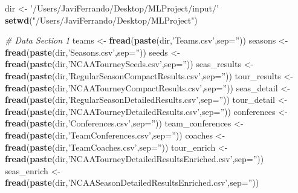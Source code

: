 \documentclass[]{article}
\newenvironment{Shaded}{\begin{snugshade}}{\end{snugshade}}
\newcommand{\KeywordTok}[1]{\textcolor[rgb]{0.13,0.29,0.53}{\textbf{#1}}}
\newcommand{\DataTypeTok}[1]{\textcolor[rgb]{0.13,0.29,0.53}{#1}}
\newcommand{\StringTok}[1]{\textcolor[rgb]{0.31,0.60,0.02}{#1}}
\newcommand{\CommentTok}[1]{\textcolor[rgb]{0.56,0.35,0.01}{\textit{#1}}}
\newcommand{\NormalTok}[1]{#1}
\begin{document}
\begin{Shaded}
\begin{Highlighting}[]
\NormalTok{dir <-}\StringTok{ '/Users/JaviFerrando/Desktop/MLProject/input/'}
\KeywordTok{setwd}\NormalTok{(}\StringTok{"/Users/JaviFerrando/Desktop/MLProject"}\NormalTok{)}

\CommentTok{# Data Section 1}
\NormalTok{teams <-}\StringTok{ }\KeywordTok{fread}\NormalTok{(}\KeywordTok{paste}\NormalTok{(dir,}\StringTok{'Teams.csv'}\NormalTok{,}\DataTypeTok{sep=}\StringTok{''}\NormalTok{))}
\NormalTok{seasons <-}\StringTok{ }\KeywordTok{fread}\NormalTok{(}\KeywordTok{paste}\NormalTok{(dir,}\StringTok{'Seasons.csv'}\NormalTok{,}\DataTypeTok{sep=}\StringTok{''}\NormalTok{))}
\NormalTok{seeds <-}\StringTok{ }\KeywordTok{fread}\NormalTok{(}\KeywordTok{paste}\NormalTok{(dir,}\StringTok{'NCAATourneySeeds.csv'}\NormalTok{,}\DataTypeTok{sep=}\StringTok{''}\NormalTok{))}
\NormalTok{seas_results <-}\StringTok{ }\KeywordTok{fread}\NormalTok{(}\KeywordTok{paste}\NormalTok{(dir,}\StringTok{'RegularSeasonCompactResults.csv'}\NormalTok{,}\DataTypeTok{sep=}\StringTok{''}\NormalTok{))}
\NormalTok{tour_results <-}\StringTok{ }\KeywordTok{fread}\NormalTok{(}\KeywordTok{paste}\NormalTok{(dir,}\StringTok{'NCAATourneyCompactResults.csv'}\NormalTok{,}\DataTypeTok{sep=}\StringTok{''}\NormalTok{))}
\NormalTok{seas_detail <-}\StringTok{ }\KeywordTok{fread}\NormalTok{(}\KeywordTok{paste}\NormalTok{(dir,}\StringTok{'RegularSeasonDetailedResults.csv'}\NormalTok{,}\DataTypeTok{sep=}\StringTok{''}\NormalTok{))}
\NormalTok{tour_detail <-}\StringTok{ }\KeywordTok{fread}\NormalTok{(}\KeywordTok{paste}\NormalTok{(dir,}\StringTok{'NCAATourneyDetailedResults.csv'}\NormalTok{,}\DataTypeTok{sep=}\StringTok{''}\NormalTok{))}
\NormalTok{conferences <-}\StringTok{ }\KeywordTok{fread}\NormalTok{(}\KeywordTok{paste}\NormalTok{(dir,}\StringTok{'Conferences.csv'}\NormalTok{,}\DataTypeTok{sep=}\StringTok{''}\NormalTok{))}
\NormalTok{team_conferences <-}\StringTok{ }\KeywordTok{fread}\NormalTok{(}\KeywordTok{paste}\NormalTok{(dir,}\StringTok{'TeamConferences.csv'}\NormalTok{,}\DataTypeTok{sep=}\StringTok{''}\NormalTok{))}
\NormalTok{coaches <-}\StringTok{ }\KeywordTok{fread}\NormalTok{(}\KeywordTok{paste}\NormalTok{(dir,}\StringTok{'TeamCoaches.csv'}\NormalTok{,}\DataTypeTok{sep=}\StringTok{''}\NormalTok{))}
\NormalTok{tour_enrich <-}\StringTok{ }\KeywordTok{fread}\NormalTok{(}\KeywordTok{paste}\NormalTok{(dir,}\StringTok{'NCAATourneyDetailedResultsEnriched.csv'}\NormalTok{,}\DataTypeTok{sep=}\StringTok{''}\NormalTok{))}
\NormalTok{seas_enrich <-}\StringTok{ }\KeywordTok{fread}\NormalTok{(}\KeywordTok{paste}\NormalTok{(dir,}\StringTok{'NCAASeasonDetailedResultsEnriched.csv'}\NormalTok{,}\DataTypeTok{sep=}\StringTok{''}\NormalTok{))}
\end{Highlighting}
\end{Shaded}
\end{document}
